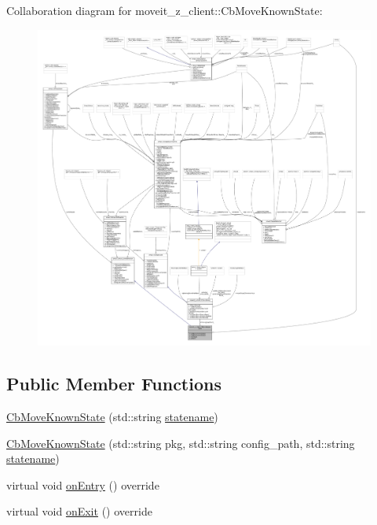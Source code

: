 Collaboration diagram for moveit\+\_\+z\+\_\+client\+:\+:Cb\+Move\+Known\+State\+:
\nopagebreak
\begin{figure}[H]
\begin{center}
\leavevmode
\includegraphics[width=350pt]{classmoveit__z__client_1_1CbMoveKnownState__coll__graph}
\end{center}
\end{figure}
\subsection*{Public Member Functions}
\begin{DoxyCompactItemize}
\item 
\hyperlink{classmoveit__z__client_1_1CbMoveKnownState_a979cd1c7a80b314c921c8ff89867a3fa}{Cb\+Move\+Known\+State} (std\+::string \hyperlink{classmoveit__z__client_1_1CbMoveKnownState_a53449b08ffa077adb2f1d4efbd37f8d0}{statename})
\item 
\hyperlink{classmoveit__z__client_1_1CbMoveKnownState_a1a24fc6b7043aae18088fbd034664b8f}{Cb\+Move\+Known\+State} (std\+::string pkg, std\+::string config\+\_\+path, std\+::string \hyperlink{classmoveit__z__client_1_1CbMoveKnownState_a53449b08ffa077adb2f1d4efbd37f8d0}{statename})
\item 
virtual void \hyperlink{classmoveit__z__client_1_1CbMoveKnownState_a2ac90afe89043bbbf35c5b63eb428430}{on\+Entry} () override
\item 
virtual void \hyperlink{classmoveit__z__client_1_1CbMoveKnownState_a336ec449b5ad07a37731f0a782b12a67}{on\+Exit} () override
\end{DoxyCompactItemize}
